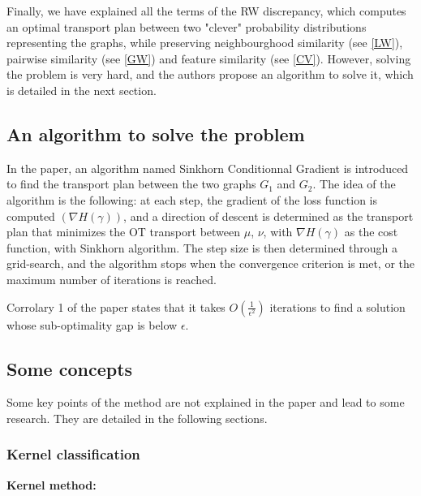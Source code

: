 \documentclass[a4paper,11pt]{article}
\begin{document}
Finally, we have explained all the terms of the RW discrepancy, which computes an optimal transport plan between two "clever" probability distributions representing the graphs, while preserving neighbourghood similarity (see \ref{LW}), pairwise similarity (see \ref{GW}) and feature similarity (see \ref{CV}).
However, solving the problem is very hard, and the authors propose an algorithm to solve it, which is detailed in the next section.


\subsection{An algorithm to solve the problem}

In the paper, an algorithm named Sinkhorn Conditionnal Gradient is introduced to find the transport plan between the two graphs $G_1$ and $G_2$. 
The idea of the algorithm is the following: at each step, the gradient of the loss function is computed $(\nabla H(\gamma))$, and a direction of descent is determined as the transport plan that minimizes the OT transport between $\mu$, $\nu$, with $\nabla H (\gamma)$ as the cost function, with Sinkhorn algorithm.
The step size is then determined through a grid-search, and the algorithm stops when the convergence criterion is met, or the maximum number of iterations is reached.

Corrolary 1 of the paper states that it takes $O(\frac{1}{\epsilon^2})$ iterations to find a solution whose sub-optimality gap is below $\epsilon$. 


\subsection{Some concepts}

Some key points of the method are not explained in the paper and lead to some research. 
They are detailed in the following sections.

\subsubsection{Kernel classification}

\textbf{Kernel method: } \\
\end{document}
